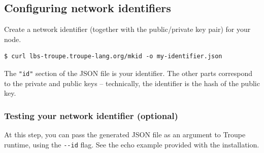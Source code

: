 \subsection{Configuring network identifiers}
\label{sec:networkid}
Create a network identifier (together with the public/private key pair) for your node. 
\begin{verbatim}
$ curl lbs-troupe.troupe-lang.org/mkid -o my-identifier.json
\end{verbatim}

The {\tt "id"} section of the JSON file is your identifier. The other 
parts correspond to the private and public keys -- technically,
the identifier is the hash of the public key.


\subsubsection{Testing your network identifier (optional)}
At this step, you can pass the generated JSON file
as an argument to Troupe runtime, using the \verb+--id+ flag. See 
the echo example provided with the installation.
